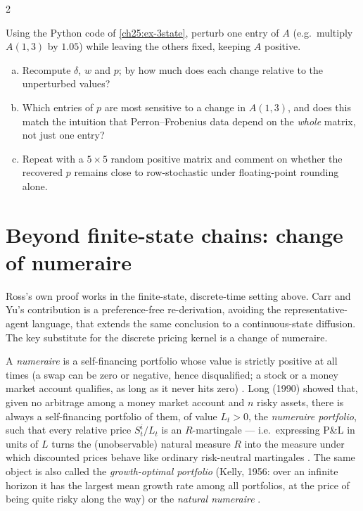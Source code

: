 \begin{paracol}{2}
\begin{exercise}\label{ch25:ex-x-sensitivity}
Using the Python code of \cref{ch25:ex-3state}, perturb one entry of $A$ (e.g.\ multiply $A(1,3)$ by $1.05$)
while leaving the others fixed, keeping $A$ positive.
\begin{enumerate}[(a)]
  \item Recompute $\delta$, $w$ and $p$; by how much does
      each change relative to the unperturbed values?
  \item Which entries of $p$ are most sensitive to a change in
      $A(1,3)$, and does this match the intuition that Perron--Frobenius data depend on the \emph{whole} matrix,
      not just one entry?
  \item Repeat with a $5\times5$ random positive matrix and comment on whether the recovered
      $p$ remains close to row-stochastic under floating-point rounding alone.
\end{enumerate}
\end{exercise}

\section{Beyond finite-state chains: change of numeraire}\label{ch25:sec-diffusion}

Ross's own proof works in the finite-state, discrete-time setting above. Carr and Yu's contribution is a
preference-free re-derivation, avoiding the representative-agent language, that extends the same conclusion
to a continuous-state diffusion. The key substitute for the discrete pricing kernel is a change of
numeraire.

\begin{definition}\label{ch25:def-numeraire}
A \emph{numeraire} is a self-financing portfolio whose value is strictly positive at all times (a swap can
be zero or negative, hence disqualified; a stock or a money market account qualifies, as long as it never
hits zero) . Long (1990) showed that, given no arbitrage among a money market account and
$n$ risky assets, there is always a self-financing portfolio of them, of value $L_t>0$, the \emph{numeraire
portfolio}, such that every relative price $S^i_t/L_t$ is an $R$-martingale --- i.e.\ expressing P\&L in
units of $L$ turns the (unobservable) natural measure $R$ into the measure under which discounted prices
behave like ordinary risk-neutral martingales . The same object is also called the
\emph{growth-optimal portfolio} (Kelly, 1956: over an infinite horizon it has the largest mean growth rate
among all portfolios, at the price of being quite risky along the way) or the \emph{natural numeraire}
.
\end{definition}


\end{paracol}
